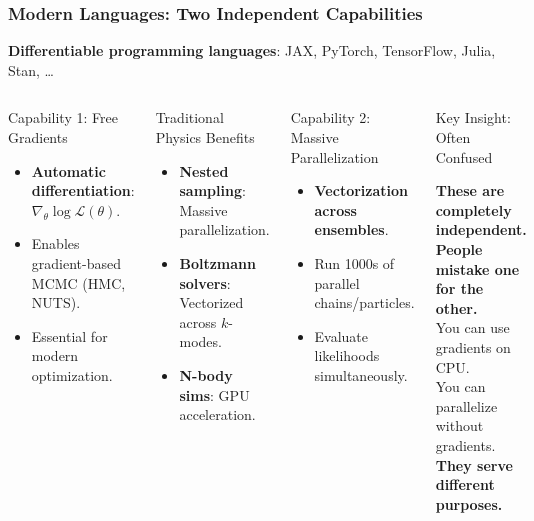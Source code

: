 \documentclass[aspectratio=169]{beamer}
\begin{document}
\begin{frame}
    \frametitle{Modern Languages: Two Independent Capabilities}
    \begin{center}
        \textbf{Differentiable programming languages}: JAX, PyTorch, TensorFlow, Julia, Stan, \ldots
    \end{center}
    \vspace{-5pt}
    \begin{columns}
        \begin{block}{Capability 1: Free Gradients}
            \begin{itemize}
                \item \textbf{Automatic differentiation}: $\nabla_\theta \log \mathcal{L}(\theta)$.
                \item Enables gradient-based MCMC (HMC, NUTS).
                \item Essential for modern optimization.
            \end{itemize}
        \end{block}
        \begin{block}{Traditional Physics Benefits}
            \begin{itemize}
                \item \textbf{Nested sampling}: Massive parallelization.
                \item \textbf{Boltzmann solvers}: Vectorized across $k$-modes.
                \item \textbf{N-body sims}: GPU acceleration.
            \end{itemize}
        \end{block}
        \begin{block}{Capability 2: Massive Parallelization}
            \begin{itemize}
                \item \textbf{Vectorization across ensembles}.
                \item Run 1000s of parallel chains/particles.
                \item Evaluate likelihoods simultaneously.
            \end{itemize}
        \end{block}
        \begin{block}{Key Insight: Often Confused}
            \begin{center}
                \textbf{These are completely independent.}\\
                \textbf{People mistake one for the other.}\\
                You can use gradients on CPU.\\
                You can parallelize without gradients.\\
                \textbf{They serve different purposes.}
            \end{center}
        \end{block}
    \end{columns}
\end{frame}
\end{document}
